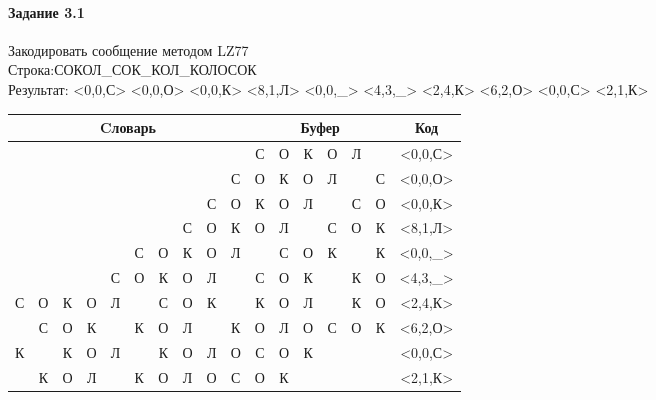 \documentclass[a4paper, 12pt]{article}
\begin{document}
\paragraph{Задание 3.1}

Закодировать сообщение методом LZ77\\
Строка:СОКОЛ\_СОК\_КОЛ\_КОЛОСОК\\
Результат: <0,0,С> <0,0,О> <0,0,К> <8,1,Л> <0,0,\_> <4,3,\_> <2,4,К> <6,2,О> <0,0,С> <2,1,К>\\
\begin{table}[h!]
\centering
\begin{tabular}{|c|c|c|c|c|c|c|c|c|c|c|c|c|c|c|c|c|} 
\hline
\multicolumn{10}{|c|}{Cловарь} & \multicolumn{6}{c|}{Буфер} & Код  \\ \hline
  &   &   &   &   &   &   &   &   &   & \cellcolor[HTML]{8CE4F6} С & О & К & О & Л &   & <0,0,С>
\\ \hline
  &   &   &   &   &   &   &   &   & С & \cellcolor[HTML]{8CE4F6} О & К & О & Л &   & С & <0,0,О>
\\ \hline
  &   &   &   &   &   &   &   & С & О & \cellcolor[HTML]{8CE4F6} К & О & Л &   & С & О & <0,0,К>
\\ \hline
  &   &   &   &   &   &   & С & \cellcolor[HTML]{FFFF00} О & К & \cellcolor[HTML]{FFFF00} О & \cellcolor[HTML]{8CE4F6} Л &   & С & О & К & <8,1,Л>
\\ \hline
  &   &   &   &   & С & О & К & О & Л & \cellcolor[HTML]{8CE4F6}   & С & О & К &   & К & <0,0,\_>
\\ \hline
  &   &   &   & \cellcolor[HTML]{FFFF00} С & \cellcolor[HTML]{FFFF00} О & \cellcolor[HTML]{FFFF00} К & О & Л &   & \cellcolor[HTML]{FFFF00} С & \cellcolor[HTML]{FFFF00} О & \cellcolor[HTML]{FFFF00} К & \cellcolor[HTML]{8CE4F6}   & К & О & <4,3,\_>
\\ \hline
С & О & \cellcolor[HTML]{FFFF00} К & \cellcolor[HTML]{FFFF00} О & \cellcolor[HTML]{FFFF00} Л & \cellcolor[HTML]{FFFF00}   & С & О & К &   & \cellcolor[HTML]{FFFF00} К & \cellcolor[HTML]{FFFF00} О & \cellcolor[HTML]{FFFF00} Л & \cellcolor[HTML]{FFFF00}   & \cellcolor[HTML]{8CE4F6} К & О & <2,4,К>
\\ \hline
  & С & О & К &   & К & \cellcolor[HTML]{FFFF00} О & \cellcolor[HTML]{FFFF00} Л &   & К & \cellcolor[HTML]{FFFF00} О & \cellcolor[HTML]{FFFF00} Л & \cellcolor[HTML]{8CE4F6} О & С & О & К & <6,2,О>
\\ \hline
К &   & К & О & Л &   & К & О & Л & О & \cellcolor[HTML]{8CE4F6} С & О & К &   &   &   & <0,0,С>
\\ \hline
  & К & \cellcolor[HTML]{FFFF00} О & Л &   & К & О & Л & О & С & \cellcolor[HTML]{FFFF00} О & \cellcolor[HTML]{8CE4F6} К &   &   &   &   & <2,1,К>
\\ \hline
\end{tabular}
\end{table}
\end{document}
